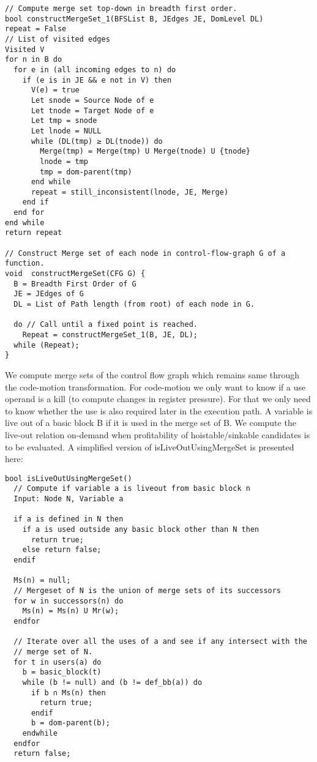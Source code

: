 \documentclass[acmlarge,review]{acmart}\settopmatter{printfolios=true}
\begin{document}
\begin{verbatim}
// Compute merge set top-down in breadth first order.
bool constructMergeSet_1(BFSList B, JEdges JE, DomLevel DL)
repeat = False
// List of visited edges
Visited V
for n in B do
  for e in (all incoming edges to n) do
    if (e is in JE && e not in V) then
      V(e) = true
      Let snode = Source Node of e
      Let tnode = Target Node of e
      Let tmp = snode
      Let lnode = NULL
      while (DL(tmp) ≥ DL(tnode)) do
        Merge(tmp) = Merge(tmp) U Merge(tnode) U {tnode}
        lnode = tmp
        tmp = dom-parent(tmp)
      end while
      repeat = still_inconsistent(lnode, JE, Merge)
    end if
  end for
end while
return repeat

// Construct Merge set of each node in control-flow-graph G of a function.
void  constructMergeSet(CFG G) {
  B = Breadth First Order of G
  JE = JEdges of G
  DL = List of Path length (from root) of each node in G.

  do // Call until a fixed point is reached.
    Repeat = constructMergeSet_1(B, JE, DL);
  while (Repeat);
}
\end{verbatim}

We compute merge sets of the control flow graph which remains same through the
code-motion transformation. For code-motion we only want to know if a use
operand is a kill (to compute changes in register pressure). For that we only
need to know whether the use is also required later in the execution path. A
variable is live out of a basic block B if it is used in the merge set of B. We
compute the live-out relation on-demand when profitability of hoistable/sinkable
candidates is to be evaluated. A simplified version of isLiveOutUsingMergeSet is
presented here:

\begin{verbatim}
bool isLiveOutUsingMergeSet()
  // Compute if variable a is liveout from basic block n
  Input: Node N, Variable a

  if a is defined in N then
    if a is used outside any basic block other than N then
      return true;
    else return false;
  endif

  Ms(n) = null;
  // Mergeset of N is the union of merge sets of its successors
  for w in successors(n) do
    Ms(n) = Ms(n) U Mr(w);
  endfor

  // Iterate over all the uses of a and see if any intersect with the
  // merge set of N.
  for t in users(a) do
    b = basic_block(t)
    while (b != null) and (b != def_bb(a)) do
      if b ∩ Ms(n) then
        return true;
      endif
      b = dom-parent(b);
    endwhile
  endfor
  return false;
\end{verbatim}
\end{document}
